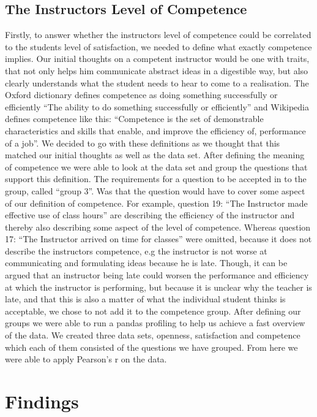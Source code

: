 \documentclass[twocolumn]{article}
\begin{document}
\subsection{The Instructors Level of Competence}
Firstly, to answer whether the instructors level of competence could be correlated to the students level of satisfaction, we needed to define what exactly competence implies. 
Our initial thoughts on a competent instructor would be one with traits, that not only helps him communicate abstract ideas in a digestible way, but also clearly understands what the student needs to hear to come to a realisation. The Oxford dictionary defines competence as doing something successfully or efficiently “The ability to do something successfully or efficiently”\cite{Oxford} and Wikipedia defines competence like this: “Competence is the set of demonstrable characteristics and skills that enable, and improve the efficiency of, performance of a job”\cite{Wiki}. We decided to go with these definitions as we thought that this matched our initial thoughts as well as the data set. After defining the meaning of competence we were able to look at the data set and group the questions that support this definition. The requirements for a question to be accepted in to the group, called “group 3”. Was that the question would have to cover some aspect of our definition of competence. For example, question 19: “The Instructor made effective use of class hours” are describing the efficiency of the instructor and thereby also describing some aspect of the level of competence. Whereas question 17: “The Instructor arrived on time for classes” were omitted, because it does not describe the instructors competence, e.g the instructor is not worse at communicating and formulating ideas because he is late. Though, it can be argued that an instructor being late could worsen the performance and efficiency at which the instructor is performing, but because it is unclear why the teacher is late, and that this is also a matter of what the individual student thinks is acceptable, we chose to not add it to the competence group. After defining our groups we were able to run a pandas profiling to help us achieve a fast overview of the data. We created three data sets, openness, satisfaction and competence which each of them consisted of the questions we have grouped. From here we were able to apply Pearson’s r on the data.


\section{Findings}\label{section-universal}
\end{document}

